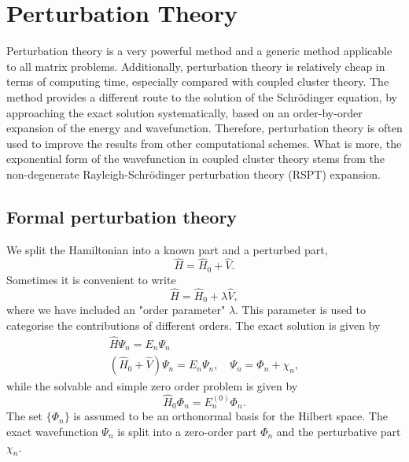 \chapter{Perturbation Theory}
\label{ch:perturbation}

Perturbation theory is a very powerful method and a generic method applicable to all 
matrix problems. Additionally, perturbation theory is relatively cheap in terms of computing
time, especially compared with coupled cluster theory. The method provides a different 
route to the solution of the Schrödinger equation, by approaching the exact solution 
systematically, based on an order-by-order expansion of the energy and wavefunction. 
Therefore, perturbation theory is often used to improve the results from other computational
schemes. What is more, the exponential form of the wavefunction in coupled cluster theory 
stems from the non-degenerate Rayleigh-Schrödinger perturbation theory (RSPT) expansion.

\section{Formal perturbation theory}

We split the Hamiltonian into a known part and a perturbed part,
\begin{equation}
    \hat{H} = \hat{H}_0 + \hat{V}.
\end{equation}
Sometimes it is convenient to write
\begin{equation}
    \label{eq:schrodinger_w_order_param}
    \hat{H} = \hat{H}_0 + \lambda\hat{V},
\end{equation}
where we have included an "order parameter" $\lambda$. This parameter is used to categorise
the contributions of different orders. 
The exact solution is given by
\begin{equation}
    \label{eq:perturbation_schrodinger}
    \begin{gathered}
        \hat{H} \Psi_n = E_n \Psi_n \\
        (\hat{H}_0 + \hat{V}) \Psi_n = E_n \Psi_n, \quad \Psi_n = \Phi_n + \chi_n,
    \end{gathered}
\end{equation}
while the solvable and simple zero order problem is given by
\begin{equation}
    \label{eq:zero_order_perturbed_schrodinger}
    \hat{H}_0 \Phi_n = E_n^{(0)} \Phi_n.
\end{equation}
The set $\{\Phi_n\}$ is assumed to be an orthonormal basis for the Hilbert space. The 
exact wavefunction $\Psi_n$ is split into a zero-order part $\Phi_n$ and the 
perturbative part $\chi_n$.

